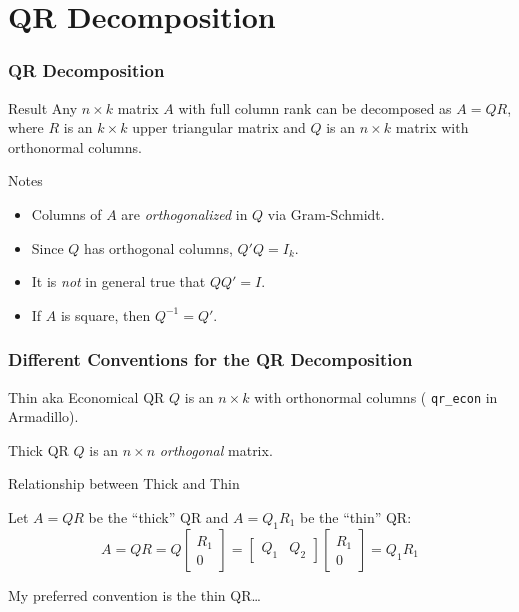 \section{QR Decomposition}
\begin{frame}
  \frametitle{QR Decomposition}

\begin{block}{Result}
Any $n\times k$ matrix $A$ with full column rank can be decomposed as $A = QR$, where $R$ is an $k\times k$ upper triangular matrix and $Q$ is an $n\times k$ matrix with orthonormal columns. 
\end{block}

\begin{block}{Notes}
  \begin{itemize}  
  \item Columns of $A$ are \emph{orthogonalized} in $Q$ via Gram-Schmidt. 
 \item Since $Q$ has orthogonal columns, $Q'Q = I_k$. 
 \item It is \emph{not} in general true that $QQ' = I$.
 \item If $A$ is square, then $Q^{-1} = Q'$.
\end{itemize}
\end{block}
\end{frame}
\begin{frame}
  \frametitle{Different Conventions for the QR Decomposition}
  

  \begin{block}{Thin aka Economical QR}
    $Q$ is an $n\times k$ with orthonormal columns ( \texttt{qr\_econ} in Armadillo).
  \end{block}

  \begin{block}{Thick QR}
    $Q$ is an $n\times n$ \emph{orthogonal} matrix.
  \end{block}

  \begin{block}{Relationship between Thick and Thin}
    
Let $A = QR$ be the ``thick'' QR and $A = Q_1 R_1$ be the ``thin'' QR: 
  $$A = QR = Q \left[\begin{array}
    {c} R_1 \\ 0 
  \end{array} \right] = \left[  \begin{array}
    {cc} Q_1 & Q_2
  \end{array}\right]\left[\begin{array}
    {c} R_1 \\ 0 
  \end{array} \right] = Q_1 R_1$$
  \end{block}

  \alert{My preferred convention is the thin QR\dots}

\end{frame}
